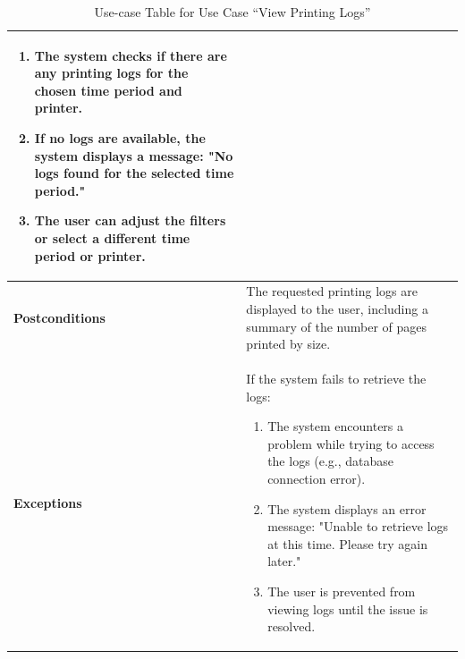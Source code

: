 \begin{enumerate}
\begin{table}[h!]
\begin{tabular}{|>{\centering\arraybackslash}m{3cm}|>{\raggedright\arraybackslash}m{10cm}|}
            \begin{enumerate}
                \item The system checks if there are any printing logs for the chosen time period and printer.
                \item If no logs are available, the system displays a message: "No logs found for the selected time period."
                \item The user can adjust the filters or select a different time period or printer.
            \end{enumerate} \\ \hline
            \textbf{Postconditions} & The requested printing logs are displayed to the user, including a summary of the number of pages printed by size. \\ \hline
            \textbf{Exceptions} & If the system fails to retrieve the logs:
            \begin{enumerate}
                \item The system encounters a problem while trying to access the logs (e.g., database connection error).
                \item The system displays an error message: "Unable to retrieve logs at this time. Please try again later."
                \item The user is prevented from viewing logs until the issue is resolved.
            \end{enumerate} \\ \hline
            \end{tabular}
            \caption{Use-case Table for Use Case “View Printing Logs”}
            \label{tab:view_printing_logs_use_case}
        \end{table}
\end{enumerate}

\newpage